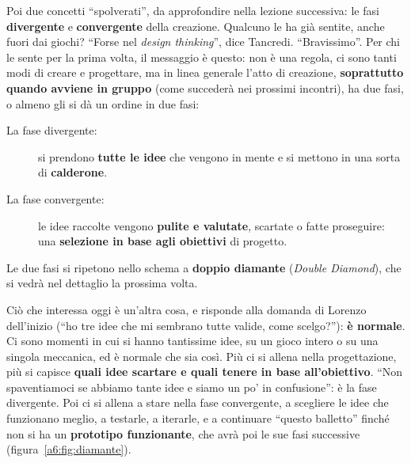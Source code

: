Poi due concetti ``spolverati'', da approfondire nella lezione successiva: le fasi
\textbf{divergente} e \textbf{convergente} della creazione. Qualcuno le ha già sentite,
anche fuori dai giochi? ``Forse nel \emph{design thinking}'', dice Tancredi.
``Bravissimo''. Per chi le sente per la prima volta, il messaggio è questo: non è una
regola, ci sono tanti modi di creare e progettare, ma in linea generale l'atto di
creazione, \textbf{soprattutto quando avviene in gruppo} (come succederà nei
prossimi incontri), ha due fasi, o almeno gli si dà un ordine in due fasi:
\begin{description}
  \item[La fase divergente:] si prendono \textbf{tutte le idee} che vengono in mente
        e si mettono in una sorta di \textbf{calderone}.
  \item[La fase convergente:] le idee raccolte vengono \textbf{pulite e valutate},
        scartate o fatte proseguire: una \textbf{selezione in base agli obiettivi} di
        progetto.
\end{description}
Le due fasi si ripetono nello schema a \textbf{doppio diamante} (\emph{Double
Diamond}), che si vedrà nel dettaglio la prossima volta.

Ciò che interessa oggi è un'altra cosa, e risponde alla domanda di Lorenzo
dell'inizio (``ho tre idee che mi sembrano tutte valide, come scelgo?''): \textbf{è
normale}. Ci sono momenti in cui si hanno tantissime idee, su un gioco intero o su
una singola meccanica, ed è normale che sia così. Più ci si allena nella
progettazione, più si capisce \textbf{quali idee scartare e quali tenere in base
all'obiettivo}. ``Non spaventiamoci se abbiamo tante idee e siamo un po' in
confusione'': è la fase divergente. Poi ci si allena a stare nella fase convergente,
a scegliere le idee che funzionano meglio, a testarle, a iterarle, e a continuare
``questo balletto'' finché non si ha un \textbf{prototipo funzionante}, che avrà poi
le sue fasi successive (figura~\ref{a6:fig:diamante}).

